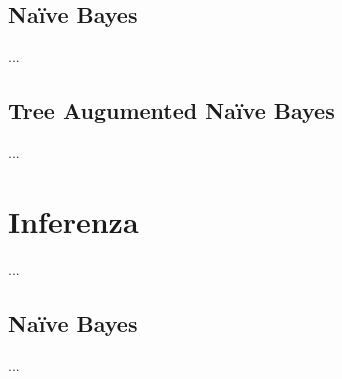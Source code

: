 \subsection{Na\"ive Bayes}\label{sec:learning-ctnb}
...

\subsection{Tree Augumented Na\"ive Bayes}\label{sec:learning-cttanb}
...

\section{Inferenza}\label{sec:inference-ctbnc}
...

\subsection{Na\"ive Bayes}\label{sec:inference-ctnb}
...


